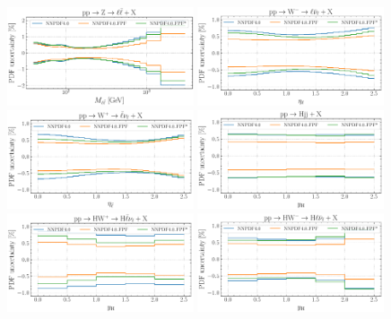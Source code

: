 \begin{figure}[htbp]
\centering
\includegraphics[width=0.49\textwidth]{plots/LHCpheno/NNPDF_DY_14TEV_40_PHENO-global.pdf}
\includegraphics[width=0.49\textwidth]{plots/LHCpheno/NNPDF_WM_14TEV_40_PHENO-global.pdf}
\includegraphics[width=0.49\textwidth]{plots/LHCpheno/NNPDF_WP_14TEV_40_PHENO-global.pdf}
\includegraphics[width=0.49\textwidth]{plots/LHCpheno/NNPDF_HVBF_14TEV_40_PHENO-global.pdf}
\includegraphics[width=0.49\textwidth]{plots/LHCpheno/NNPDF_HWP_14TEV_40_PHENO-global.pdf}
\includegraphics[width=0.49\textwidth]{plots/LHCpheno/NNPDF_HWM_14TEV_40_PHENO-global.pdf}

\end{figure}
